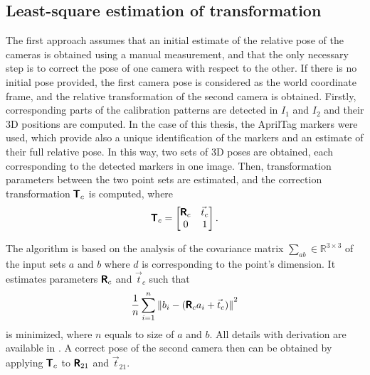 \subsection{Least-square estimation of transformation}
\label{sec:lsq_umeyama}
The first approach assumes that an initial estimate of the relative pose of the cameras is obtained using a manual measurement, and that the only necessary step is to correct the pose of one camera with respect to the other.
If there is no initial pose provided, the first camera pose is considered as the world coordinate frame, and the relative transformation of the second camera is obtained. 
Firstly, corresponding parts of the calibration patterns are detected in $I_1$ and $I_2$ and their 3D positions are computed.
In the case of this thesis, the AprilTag markers \cite{Malyuta2019} were used, which provide also a unique identification of the markers and an estimate of their full relative pose.
In this way, two sets of 3D poses are obtained, each corresponding to the detected markers in one image.
Then, transformation parameters between the two point sets are estimated, and the correction transformation $\pmb{\mathsf{T}}_{c}$ is computed, where
\begin{equation}
    \pmb{\mathsf{T}}_{c} = 
    \begin{bmatrix}
        \pmb{\mathsf{R}}_c & \vec{t}_c \\ 
        0 & 1
    \end{bmatrix}.
\end{equation}

The algorithm is based on the analysis of the covariance matrix $\sum_{ab} \in \mathbb{R}^{3 \times 3}$ of the input sets $a$ and $b$ where $d$ is corresponding to the point's dimension. 
It estimates parameters $\pmb{\mathsf{R}}_c$ and $\vec{t}_c$ such that
\begin{equation}
    \frac{1}{n} \sum_{i=1}^{n}{\lVert b_i - (\pmb{\mathsf{R}}_c a_i + \vec{t}_c) \rVert}^2
\end{equation}
is minimized, where $n$ equals to size of $a$ and $b$.
All details with derivation are available in \cite{Umeyama1991}.
A correct pose of the second camera then can be obtained by applying $\pmb{\mathsf{T}}_{c}$ to $\pmb{\mathsf{R}}_{21}$ and $\vec{t}_{21}$.

